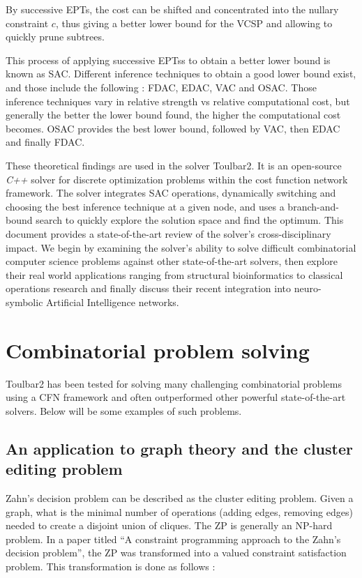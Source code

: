 \documentclass[a4paper]{article}
\begin{document}
By successive \ac{EPTs}, the cost can be shifted and concentrated into the nullary constraint $c$, thus giving a better lower bound for the \ac{VCSP} and allowing to quickly prune subtrees.
\newline

This process of applying successive \acp{EPTs} to obtain a better lower bound is known as \ac{SAC}. Different inference techniques to obtain a good lower bound exist, and those include the following : \ac{FDAC}, \ac{EDAC}, \ac{VAC} and \ac{OSAC}. Those inference techniques vary in relative strength vs relative computational cost, but generally the better the lower bound found, the higher the computational cost becomes. \ac{OSAC} provides the best lower bound, followed by \ac{VAC}, then \ac{EDAC} and finally \ac{FDAC}.
\newline

These theoretical findings are used in the solver Toulbar2. It is an open-source \textit{C++} solver for discrete optimization problems within the cost function network framework. The solver integrates \ac{SAC} operations, dynamically switching and choosing the best inference technique at a given node, and uses a branch-and-bound search to quickly explore the solution space and find the optimum. This document provides a state-of-the-art review of the solver’s cross-disciplinary impact. We begin by examining the solver’s ability to solve difficult combinatorial computer science problems against other state-of-the-art solvers, then explore their real world applications ranging from structural bioinformatics to classical operations research and finally discuss their recent integration into neuro-symbolic Artificial Intelligence networks.


\clearpage
\section{Combinatorial problem solving}

Toulbar2 has been tested for solving many challenging combinatorial problems using a \ac{CFN} framework and often outperformed other powerful state-of-the-art solvers.
Below will be some examples of such problems.

\subsection{An application to graph theory and the cluster editing problem}
Zahn's decision problem can be described as the cluster editing problem. Given a graph, what is the minimal number of operations (adding edges, removing edges) needed to create a disjoint union of cliques. The \ac{ZP} is generally an NP-hard problem.
In a paper titled ``A constraint programming approach to the Zahn’s decision problem''\cite{amel_constraint_2014}, the \ac{ZP} was transformed into a valued constraint satisfaction problem. This transformation is done as follows : 
\end{document}
